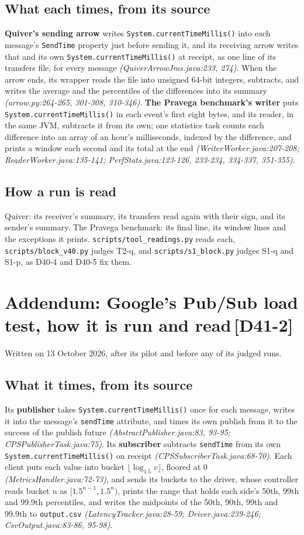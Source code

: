 \documentclass[11pt]{article}
\newcommand{\gl}[1]{{\color{soft}\itshape\small (#1)}}
\newcommand{\chgold}[1]{\,{\color{oldcol}\bfseries\footnotesize[#1]}}
\begin{document}
\subsection*{What each times, from its source}
\textbf{Quiver's sending arrow} writes \texttt{System.currentTimeMillis()} into each message's
\texttt{SendTime} property just before sending it, and its receiving arrow writes that and its own
\texttt{System.currentTimeMillis()} at receipt, as one line of its transfers file, for every message
\gl{QuiverArrowJms.java:233, 274}. When the arrow ends, its wrapper reads the file into unsigned
64-bit integers, subtracts, and writes the average and the percentiles of the differences into its
summary \gl{arrow.py:264-265, 301-308, 310-346}. \textbf{The Pravega benchmark's writer} puts
\texttt{System.currentTimeMillis()} in each event's first eight bytes, and its reader, in the same
JVM, subtracts it from its own; one statistics task counts each difference into an array of an hour's
milliseconds, indexed by the difference, and prints a window each second and its total at the end
\gl{WriterWorker.java:207-208; ReaderWorker.java:135-141; PerfStats.java:123-126, 233-234, 334-337,
351-355}.

\subsection*{How a run is read}
Quiver: its receiver's summary, its transfers read again with their sign, and its sender's summary.
The Pravega benchmark: its final line, its window lines and the exceptions it prints.
\texttt{scripts/tool\_readings.py} reads each, \texttt{scripts/block\_v40.py} judges T2-q, and
\texttt{scripts/s1\_block.py} judges S1-q and S1-p, as D40-4 and D40-5 fix them.

\section[Addendum: Google's Pub/Sub load test]{Addendum: Google's Pub/Sub load test, how it is run and read\protect\chgold{D41-2}}\label{sec:addendum-v41}
Written on 13 October 2026, after its pilot and before any of its judged runs.

\subsection*{What it times, from its source}
Its \textbf{publisher} takes \texttt{System.currentTimeMillis()} once for each message, writes it into
the message's \texttt{sendTime} attribute, and times its own publish from it to the success of the
publish future \gl{AbstractPublisher.java:83, 93-95; CPSPublisherTask.java:75}. Its
\textbf{subscriber} subtracts \texttt{sendTime} from its own \texttt{System.currentTimeMillis()} on
receipt \gl{CPSSubscriberTask.java:68-70}. Each client puts each value into bucket
$\lfloor\log_{1.5} v\rfloor$, floored at 0 \gl{MetricsHandler.java:72-73}, and sends its buckets to the
driver, whose controller reads bucket $n$ as $[1.5^{n-1}, 1.5^{n})$, prints the range that holds each
side's 50th, 99th and 99.9th percentiles, and writes the midpoints of the 50th, 90th, 99th and 99.9th
to \texttt{output.csv} \gl{LatencyTracker.java:28-59; Driver.java:239-246; CsvOutput.java:83-86,
95-98}.
\end{document}
